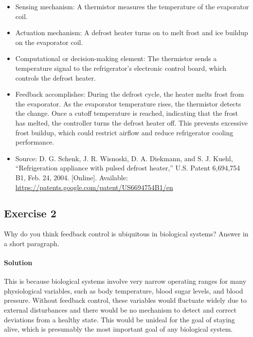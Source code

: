 \documentclass[11pt]{article}
\begin{document}
\begin{itemize}

    \item Sensing mechanism: A thermistor measures the temperature of the evaporator coil.

    \item Actuation mechanism: A defrost heater turns on to melt frost and ice buildup on the evaporator coil.

    \item Computational or decision-making element: The thermistor sends a temperature signal to the refrigerator's electronic control board, which controls the defrost heater.

    \item Feedback accomplishes: During the defrost cycle, the heater melts frost from the evaporator. As the evaporator temperature rises, the thermistor detects the change. Once a cutoff temperature is reached, indicating that the frost has melted, the controller turns the defrost heater off. This prevents excessive frost buildup, which could restrict airflow and reduce refrigerator cooling performance.
    \item Source: D. G. Schenk, J. R. Wisnoski, D. A. Diekmann, and S. J. Kuehl, ``Refrigeration appliance with pulsed defrost heater,'' U.S. Patent 6,694,754 B1, Feb. 24, 2004. [Online]. Available: \url{https://patents.google.com/patent/US6694754B1/en}
\end{itemize}

\subsection*{Exercise 2}
Why do you think feedback control is ubiquitous in biological systems? Answer in a short paragraph.

\paragraph{Solution} This is because biological systems involve very narrow operating ranges for many physiological variables, such as body temperature, blood sugar levels, and blood pressure. Without feedback control, these variables would fluctuate widely due to external disturbances and there would be no mechanism to detect and correct deviations from a healthy state. This would be unideal for the goal of staying alive, which is presumably the most important goal of any biological system.
\end{document}

